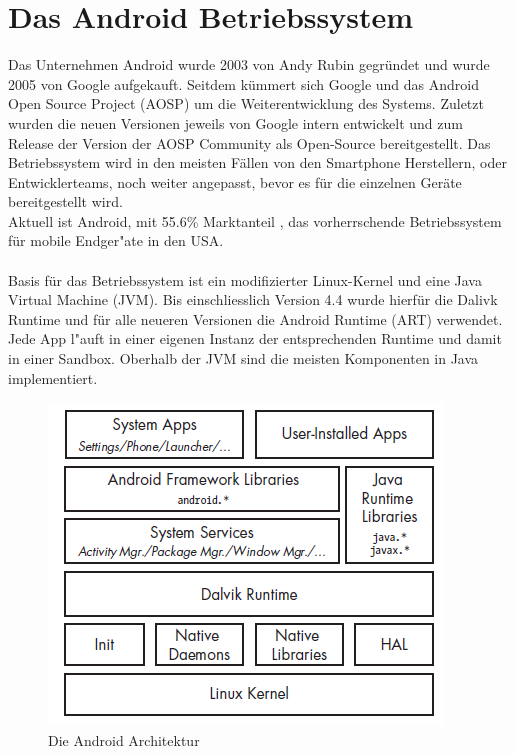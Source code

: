 
\section{Das Android Betriebssystem}
	Das Unternehmen Android wurde 2003 von Andy Rubin gegründet und wurde 2005 von Google aufgekauft. Seitdem kümmert sich Google und das Android Open Source Project (AOSP) um die Weiterentwicklung des Systems. Zuletzt wurden die neuen Versionen jeweils von Google intern entwickelt und zum Release der Version der AOSP Community als Open-Source bereitgestellt. Das Betriebssystem wird in den meisten Fällen von den Smartphone Herstellern, oder Entwicklerteams, noch weiter angepasst, bevor es für die einzelnen Geräte bereitgestellt wird.\\
	Aktuell ist Android, mit 55.6\% Marktanteil \cite{MobileOsStat}, das vorherrschende Betriebssystem für mobile Endger"ate in den USA.
	\\\\
	Basis für das Betriebssystem ist ein modifizierter Linux-Kernel und eine Java Virtual Machine (JVM). Bis einschliesslich Version 4.4 wurde hierfür die Dalivk Runtime und für alle neueren Versionen die Android Runtime (ART) verwendet. Jede App l"auft in einer eigenen Instanz der entsprechenden Runtime und damit in einer Sandbox.\newline
	Oberhalb der JVM sind die meisten Komponenten in Java implementiert.\\
	
	\begin{figure}[h]
		\centering
		\includegraphics[width=0.7\linewidth]{android_pages/graphics/architektur_android_.png}
		\caption{Die Android Architektur \protect\cite{Elenkov2014} }
		\label{fig:architektur_android}
	\end{figure}